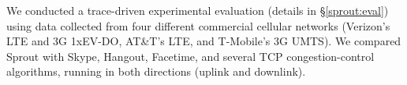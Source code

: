 






We conducted a trace-driven experimental evaluation (details in
\S\ref{sprout:eval}) using data collected from four different commercial
cellular networks (Verizon's LTE and 3G 1xEV-DO, AT\&T's LTE, and
T-Mobile's 3G UMTS). We compared Sprout with Skype, Hangout, Facetime,
and several TCP congestion-control algorithms, running in both
directions (uplink and downlink).

